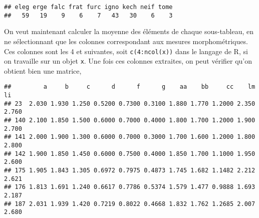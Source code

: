 \begin{knitrout}
\color{fgcolor}\begin{kframe}
\begin{flushleft}
\ttfamily\noindent
{}\hlkeyword{(}\hlkeyword{(}\hlkeyword{,}{\ }\hlkeyword{)}\hlkeyword{)}\mbox{}
\normalfont
\end{flushleft}
\begin{verbatim}
## eleg erge falc frat furc igno kech neif tome 
##   59   19    9    6    7   43   30    6    3 
\end{verbatim}
\end{kframe}
\end{knitrout}


On veut maintenant calculer la moyenne des éléments de chaque sous-tableau, en ne sélectionnant que les colonnes correspondant aux mesures morphométriques.
Ces colonnes sont les 4 et suivantes, soit \texttt{c(4:ncol(x))} dans le langage de R, si on travaille sur un objet \texttt{x}.
Une fois ces colonnes extraites, on peut vérifier qu'on obtient bien une matrice,

\begin{knitrout}
\color{fgcolor}\begin{kframe}
\begin{flushleft}
\ttfamily\noindent
{}\hlkeyword{\usebox{\hlnormalsizeboxdollar}}\hlkeyword{[}\hlkeyword{,}{\ }\hlkeyword{(}\hlkeyword{:}\hlkeyword{(}\hlkeyword{\usebox{\hlnormalsizeboxdollar}}\hlkeyword{)}\hlkeyword{)}\hlkeyword{]}\mbox{}
\normalfont
\end{flushleft}
\begin{verbatim}
##         a     b     c      d      f      g    aa    bb     cc    lm    li
## 23  2.030 1.930 1.250 0.5200 0.7300 0.3100 1.880 1.770 1.2000 2.350 2.760
## 140 2.100 1.850 1.500 0.6000 0.7000 0.4000 1.800 1.700 1.2000 1.900 2.700
## 141 2.000 1.900 1.300 0.6000 0.7000 0.3000 1.700 1.600 1.2000 1.800 2.800
## 142 1.900 1.850 1.450 0.6000 0.7500 0.4000 1.850 1.700 1.1000 1.950 2.600
## 175 1.905 1.843 1.305 0.6972 0.7975 0.4873 1.745 1.682 1.1482 2.212 2.621
## 176 1.813 1.691 1.240 0.6617 0.7786 0.5374 1.579 1.477 0.9888 1.693 2.187
## 187 2.031 1.939 1.420 0.7219 0.8022 0.4668 1.832 1.762 1.2685 2.007 2.680
\end{verbatim}
\end{kframe}
\end{knitrout}


